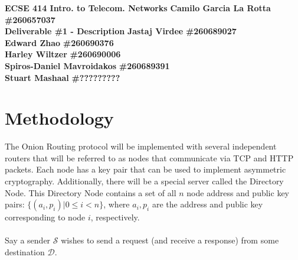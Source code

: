 \documentclass[10pt]{article}
\begin{document}
\noindent
\large \textbf{ECSE 414 Intro. to Telecom. Networks} \hfill \textbf{Camilo Garcia La Rotta} \textbf{\#260657037} \\
\large \textbf{Deliverable \#1 - Description} \hfill \textbf{Jastaj Virdee} \textbf{\#260689027} \\
\text{} \hfill \textbf{Edward Zhao} \textbf{\#260690376}\\
\text{} \hfill \textbf{Harley Wiltzer} \textbf{\#260690006}\\
\text{} \hfill \textbf{Spiros-Daniel Mavroidakos} \textbf{\#260689391}\\
\text{} \hfill \textbf{Stuart Mashaal} \textbf{\#?????????}\\

\section*{Methodology}
The Onion Routing protocol will be implemented with several independent routers
that will be referred to as nodes that communicate via TCP and HTTP packets.
Each node has a key pair that can be used to implement asymmetric cryptography.
Additionally, there will be a special server called the Directory Node. This
Directory Node contains a set of all $n$ node address and public key pairs: $\{(a_i,
p_i) | 0 \leq i < n\}$, where $a_i, p_i$ are the address and  public key
corresponding to node $i$, respectively.\\\\
Say a sender $\mathcal{S}$ wishes to send a request (and receive a response)
from some destination $\mathcal{D}$.
\end{document}
